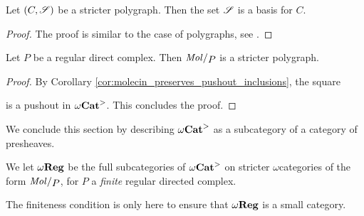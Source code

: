 \begin{lem} \label{lem:stricter_polygraph_basis}
    Let \( (C, \mathscr{S}) \) be a stricter polygraph.
    Then the set \( \mathscr{S} \) is a basis for \( C \).
\end{lem}
\begin{proof}
    The proof is similar to the case of polygraphs, see \cite[Proposition 15.1.8, Lemma 16.6.2]{ara2025polygraphs}.
\end{proof}

\begin{lem} \label{lem:stricter_regular_complex_are_stricter_polygraph}
    Let \( P \) be a regular direct complex.
    Then \( \molecin{P} \) is a stricter polygraph.
\end{lem}
\begin{proof}
    By Corollary \ref{cor:molecin_preserves_pushout_inclusions}, the square
    \begin{center}
    \end{center}
    is a pushout in \( {\omega\mathbf{Cat}}^> \).
    This concludes the proof.
\end{proof}

\noindent We conclude this section by describing \( {\omega\mathbf{Cat}}^> \) as a subcategory of a category of presheaves.

\begin{dfn}
    We let \( \omega\mathbf{Reg} \) be the full subcategories of \( {\omega\mathbf{Cat}}^> \) on stricter \( \omega \)\nbd categories of the form \( \molecin{P} \), for \( P \) a \emph{finite} regular directed complex.
\end{dfn}

\begin{comm}
    The finiteness condition is only here to ensure that \( \omega\mathbf{Reg} \) is a small category. 
\end{comm}

